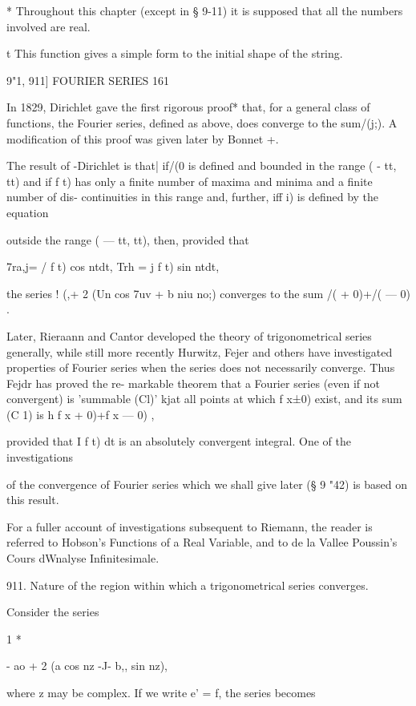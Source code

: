 * Throughout this chapter (except in § 9-11) it is supposed that all the numbers involved are 
real. 

t This function gives a simple form to the initial shape of the string. 



9"1, 911] FOURIER SERIES 161 

In 1829, Dirichlet gave the first rigorous proof* that, for a general class of functions, 
the Fourier series, defined as above, does converge to the sum/(j;). A modification of this 
 proof was given later by Bonnet +. 

The result of -Dirichlet is that| if/(0 is defined and bounded in the range ( - tt, tt) and 
if f t) has only a finite number of maxima and minima and a finite number of dis- 
continuities in this range and, further, iff i) is defined by the equation 

outside the range ( — tt, tt), then, provided that 

7ra,j= / f t) cos ntdt, Trh = j f t) sin ntdt, 

the series ! (,+ 2 (Un cos 7uv + b  niu no;) converges to the sum    /(  + 0)+/(  — 0) . 

Later, Rieraann and Cantor developed the theory of trigonometrical series generally, 
while still more recently Hurwitz, Fejer and others have investigated properties of Fourier 
series when the series does not necessarily converge. Thus Fejdr has proved the re- 
markable theorem that a Fourier series (even if not convergent) is 'summable (Cl)' 
kjat all points at which f x±0) exist, and its sum (C 1) is h  f x + 0)+f x — 0) , 

provided that I f t) dt is an absolutely convergent integral. One of the investigations 

of the convergence of Fourier series which we shall give later (§ 9 "42) is based on this result. 

For a fuller account of investigations subsequent to Riemann, the reader is referred to 
Hobson's Functions of a Real Variable, and to de la Vallee Poussin's Cours dWnalyse 
Infinitesimale. 

911. Nature of the region within which a trigonometrical series converges. 

Consider the series 

1 * 

- ao + 2 (a  cos nz -J- b,, sin nz), 

where z may be complex. If we write e'  = f, the series becomes 

